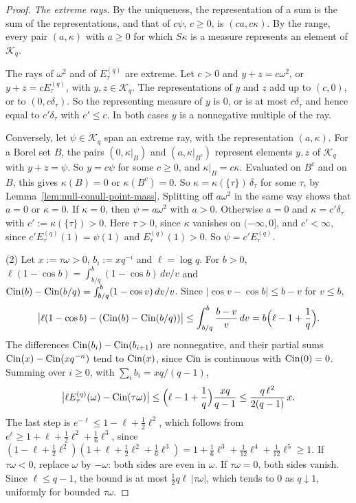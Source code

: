 \begin{proof}
\emph{The extreme rays.} By the uniqueness, the representation of a sum is the sum of the
representations, and that of $c\psi$, $c \ge 0$, is $(ca, c\kappa)$. By the range, every pair
$(a,\kappa)$ with $a \ge 0$ for which $S\kappa$ is a \Levy{} measure represents an element of
$\mathcal{K}_q$.

The rays of $\omega^2$ and of $E^{(q)}_\tau$ are extreme. Let $c > 0$ and $y + z = c\omega^2$, or
$y + z = cE^{(q)}_\tau$, with $y, z \in \mathcal{K}_q$. The representations of $y$ and $z$ add up to
$(c, 0)$, or to $(0, c\delta_\tau)$. So the representing measure of $y$ is $0$, or is at most
$c\delta_\tau$ and hence equal to $c'\delta_\tau$ with $c' \le c$. In both cases $y$ is a nonnegative
multiple of the ray.

Conversely, let $\psi \in \mathcal{K}_q$ span an extreme ray, with the representation $(a, \kappa)$.
For a Borel set $B$, the pairs $(0, \kappa|_B)$ and $(a, \kappa|_{B^c})$ represent elements $y, z$
of $\mathcal{K}_q$ with $y + z = \psi$. So $y = c\psi$ for some $c \ge 0$, and $\kappa|_B = c\kappa$.
Evaluated on $B^c$ and on $B$, this gives $\kappa(B) = 0$ or $\kappa(B^c) = 0$. So
$\kappa = \kappa(\{\tau\})\,\delta_\tau$ for some $\tau$, by
Lemma~\ref{lem:null-conull-point-mass}. Splitting off $a\omega^2$ in the same way shows that
$a = 0$ or $\kappa = 0$. If $\kappa = 0$, then $\psi = a\omega^2$ with $a > 0$. Otherwise $a = 0$ and
$\kappa = c'\delta_\tau$ with $c' := \kappa(\{\tau\}) > 0$. Here $\tau > 0$, since $\kappa$ vanishes on
$(-\infty,0]$, and $c' < \infty$, since $c'E^{(q)}_\tau(1) = \psi(1)$ and $E^{(q)}_\tau(1) > 0$. So
$\psi = c'E^{(q)}_\tau$.

(2) Let $x := \tau\omega > 0$, $b_i := xq^{-i}$ and $\ell = \log q$. For $b > 0$,
$\ell(1 - \cos b) = \int_{b/q}^b(1 - \cos b)\,dv/v$ and
$\operatorname{Cin}(b) - \operatorname{Cin}(b/q) = \int_{b/q}^b(1 - \cos v)\,dv/v$. Since $|\cos v - \cos b| \le b - v$ for
$v \le b$,
\[
  \bigl|\ell(1 - \cos b) - (\operatorname{Cin}(b) - \operatorname{Cin}(b/q))\bigr| \le \int_{b/q}^b\frac{b - v}{v}\,dv
  = b\Bigl(\ell - 1 + \frac1q\Bigr).
\]
The differences $\operatorname{Cin}(b_i) - \operatorname{Cin}(b_{i+1})$ are nonnegative, and their partial sums
$\operatorname{Cin}(x) - \operatorname{Cin}(xq^{-n})$ tend to $\operatorname{Cin}(x)$, since $\operatorname{Cin}$ is continuous with $\operatorname{Cin}(0) = 0$. Summing
over $i \ge 0$, with $\sum_ib_i = xq/(q - 1)$,
\[
  \bigl|\ell E^{(q)}_\tau(\omega) - \operatorname{Cin}(\tau\omega)\bigr|
  \le \Bigl(\ell - 1 + \frac1q\Bigr)\frac{xq}{q - 1} \le \frac{q\,\ell^2}{2(q - 1)}\,x .
\]
The last step is $e^{-\ell} \le 1 - \ell + \tfrac12\ell^2$, which follows from
$e^\ell \ge 1 + \ell + \tfrac12\ell^2 + \tfrac16\ell^3$, since
$(1 - \ell + \tfrac12\ell^2)(1 + \ell + \tfrac12\ell^2 + \tfrac16\ell^3)
= 1 + \tfrac16\ell^3 + \tfrac1{12}\ell^4 + \tfrac1{12}\ell^5 \ge 1$. If $\tau\omega < 0$, replace
$\omega$ by $-\omega$: both sides are even in $\omega$. If $\tau\omega = 0$, both sides vanish. Since
$\ell \le q - 1$, the bound is at most $\tfrac12q\ell\,|\tau\omega|$, which tends to $0$ as
$q \downarrow 1$, uniformly for bounded $\tau\omega$.


\end{proof}
